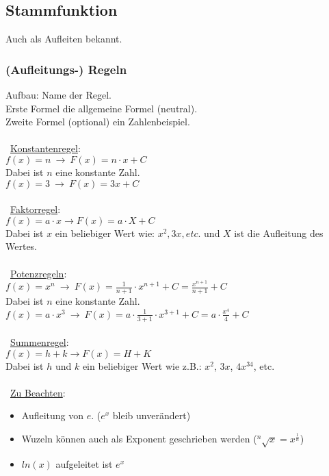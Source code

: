 \subsection{Stammfunktion}
Auch als Aufleiten bekannt.
\subsubsection{(Aufleitungs-) Regeln}
\label{sec:aufleitungs_regeln}
Aufbau: Name der Regel. \\
Erste Formel die allgemeine Formel (neutral). \\
Zweite Formel (optional) ein Zahlenbeispiel. \\\\
\
\underline{Konstantenregel}: \\
$f(x) = n\ \rightarrow\ F(x) = n\cdot x + C$ \\
Dabei ist $n$ eine konstante Zahl. \\
$f(x) = 3\ \rightarrow\ F(x) = 3x + C$ \\\\
\
\underline{Faktorregel}: \\
$f(x) = a\cdot x \rightarrow F(x) = a\cdot X + C$ \\
Dabei ist $x$ ein beliebiger Wert wie: $x^2, 3x, etc.$ und $X$ ist die Aufleitung des Wertes. \\\\
\
\underline{Potenzregeln}: \\
$f(x) = x^n\ \rightarrow\ F(x) = \frac{1}{n + 1}\cdot x^{n + 1} + C = \frac{x^{n+1}}{n+1} + C$\\
Dabei ist $n$ eine konstante Zahl. \\
$f(x) = a\cdot x^3\ \rightarrow\ F(x) = a\cdot \frac{1}{3 + 1}\cdot x^{3 + 1} + C= a\cdot \frac{x^{4}}{4} + C$ \\\\
\
\underline{Summenregel}: \\
$f(x) = h + k \rightarrow F(x) = H + K$ \\
Dabei ist $h$ und $k$ ein beliebiger Wert wie z.B.: $x^2$, $3x$, $4x^34$, etc. \\\\
\
\underline{Zu Beachten}:
\begin{itemize}
    \item Aufleitung von $e$. ($e^x$ bleib unverändert)
    \item Wuzeln können auch als Exponent geschrieben werden ($^n\sqrt{x} = x^{\frac{1}{n}}$)
    \item $ln(x)$ aufgeleitet ist $e^x$
\end{itemize}

